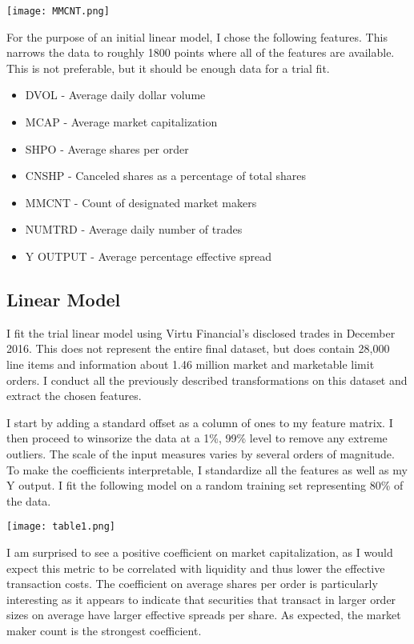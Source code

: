 \documentclass{article}
\begin{document}
\begin{multicols}{2}
\begingroup
    \centering
    \texttt{[image: MMCNT.png]}
\endgroup
\vspace{3mm}
\par

\noindent For the purpose of an initial linear model, I chose the following features. This narrows the data to roughly 1800 points where all of the features are available. This is not preferable, but it should be enough data for a trial fit.

\begin{itemize}
 \item DVOL - Average daily dollar volume
\item MCAP - Average market capitalization 
\item SHPO - Average shares per order
\item CNSHP - Canceled shares as a percentage of total shares
\item MMCNT - Count of designated market makers
\item NUMTRD - Average daily number of trades
\item Y OUTPUT - Average percentage effective spread
\end{itemize}


\subsection{Linear Model}
\par
I fit the trial linear model using Virtu Financial's disclosed trades in December 2016. This does not represent the entire final dataset, but does contain 28,000 line items and information about 1.46 million market and marketable limit orders. I conduct all the previously described transformations on this dataset and extract the chosen features.
\par
\par 
I start by adding a standard offset as a column of ones to my feature matrix. I then proceed to winsorize the data at a 1\%, 99\% level to remove any extreme outliers. The scale of the input measures varies by several orders of magnitude. To make the coefficients interpretable, I standardize all the features as well as my Y output. I fit the following model on a random training set representing 80\% of the data.


    \texttt{[image: table1.png]}
\par
I am surprised to see a positive coefficient on market capitalization, as I would expect this metric to be correlated with liquidity and thus lower the effective transaction costs. The coefficient on average shares per order is particularly interesting as it appears to indicate that securities that transact in larger order sizes on average have larger effective spreads per share. As expected, the market maker count is the strongest coefficient.




\end{multicols}
\end{document}
